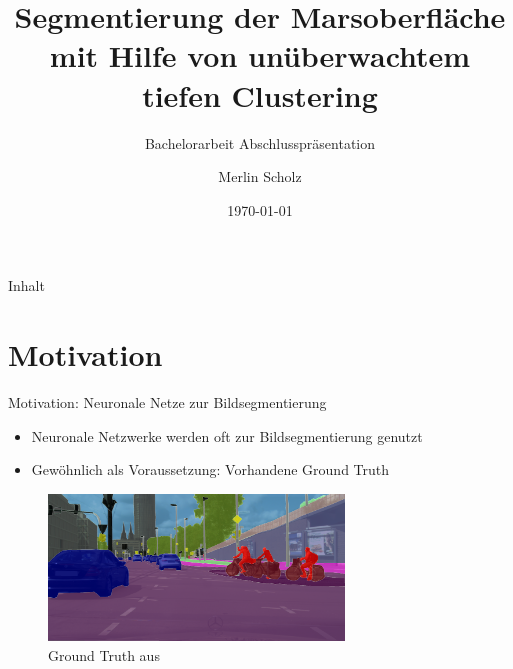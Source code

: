 \documentclass{beamer}
\title{Segmentierung der Marsoberfläche mit Hilfe von unüberwachtem tiefen Clustering}
\subtitle{Bachelorarbeit Abschlusspräsentation}
\author{Merlin Scholz}
\date{\today}
\institute[TU Dortmund]{Mustererkennung,\\ Informatik XII, Technische Universität Dortmund}
\begin{document}
\maketitle

\begin{frame}{Inhalt}
\tableofcontents
\end{frame}


\section{Motivation}
\begin{frame}{Motivation: Neuronale Netze zur Bildsegmentierung}
\begin{itemize}
	\item Neuronale Netzwerke werden oft zur Bildsegmentierung genutzt
	\item Gewöhnlich als Voraussetzung: Vorhandene Ground Truth
\end{itemize}
	\begin{figure}[h!]
		\includegraphics[width=0.7\textwidth,keepaspectratio]{gfx/koeln00.png}
		\caption{Ground Truth aus \cite{cityscapes}}
	\end{figure}
\end{frame}
\end{document}
